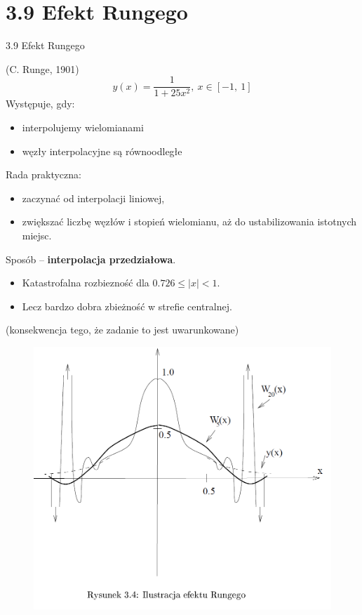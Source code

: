 \section{3.9 Efekt Rungego}
\begin{frame}
{3.9 Efekt Rungego}

(C. Runge, 1901)
$$
y(x)=\frac{1}{1+25x^{2}},\ x\in[-1,\ 1]
$$
Występuje, gdy:
\begin{itemize}
\item interpolujemy wielomianami

\item węzły interpolacyjne są równoodległe
\end{itemize}

Rada praktyczna:

\begin{itemize}
\item zaczynać od interpolacji liniowej,

\item zwiększać liczbę węzłów i stopień wielomianu, aż do ustabilizowania istotnych miejsc.
\end{itemize}


Sposób -- \textbf{interpolacja przedziałowa}.
\begin{itemize}
\item Katastrofalna rozbiezność dla $0.726\leq|x|<1$.

\item Lecz bardzo dobra zbieżność w strefie centralnej.
\end{itemize}

(konsekwencja tego, że zadanie to jest { uwarunkowane})
\end{frame}
\begin{frame}
\begin{figure}[h]
			\includegraphics[scale=0.35]{img/3/interpol_3_9}
	\end{figure}
\end{frame}
